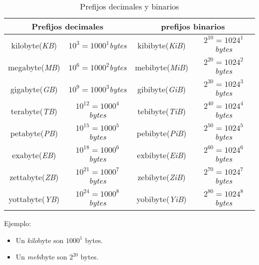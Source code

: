 \documentclass[12pt]{article}
\begin{document}
\begin{table}[h]

    \centering

    \caption{Prefijos decimales y binarios}
    \label{tablaComparacionPrefijos}

    \begin{tabular}{ | c | c | c | c | }
        \hline
        \multicolumn{2}{|c|}{\textbf{Prefijos decimales}} &
        \multicolumn{2}{|c|}{\textbf{prefijos binarios}}\\
        \hline
        \hline
        kilobyte(\emph{KB}) & $10^{3}=1000^{1}$\emph{bytes} &
        kibibyte(\emph{KiB}) & $2^{10}=1024^{1}$\emph{bytes} \\
        \hline
        megabyte(\emph{MB}) & $10^{6}=1000^{2}$\emph{bytes} &
        mebibyte(\emph{MiB}) & $2^{20}=1024^{2}$\emph{bytes} \\
        \hline
        gigabyte(\emph{GB}) & $10^{9}=1000^{3}$\emph{bytes} &
        gibibyte(\emph{GiB}) & $2^{30}=1024^{3}$\emph{bytes} \\
        \hline
        terabyte(\emph{TB}) & $10^{12}=1000^{4}$\emph{bytes} &
        tebibyte(\emph{TiB}) & $2^{40}=1024^{4}$\emph{bytes} \\
        \hline
        petabyte(\emph{PB}) & $10^{15}=1000^{5}$\emph{bytes} &
        pebibyte(\emph{PiB}) & $2^{50}=1024^{5}$\emph{bytes} \\
        \hline
        exabyte(\emph{EB}) & $10^{18}=1000^{6}$\emph{bytes} &
        exbibyte(\emph{EiB}) & $2^{60}=1024^{6}$\emph{bytes} \\
        \hline
        zettabyte(\emph{ZB}) & $10^{21}=1000^{7}$\emph{bytes} &
        zebibyte(\emph{ZiB}) & $2^{70}=1024^{7}$\emph{bytes} \\
        \hline
        yottabyte(\emph{YB}) & $10^{24}=1000^{8}$\emph{bytes} &
        yobibyte(\emph{YiB}) & $2^{80}=1024^{8}$\emph{bytes} \\
        \hline
    \end{tabular}

    \vspace{2\topsep}
    Ejemplo:
    \vspace{-1\topsep}
    \begin{itemize}

        \itemsep2pt \parskip0pt 
        \item   Un \emph{kilo}byte son $1000^{1}$ bytes.
        \item   Un \emph{mebi}byte son $2^{20}$ bytes.

    \end{itemize}

\end{table}
\end{document}
